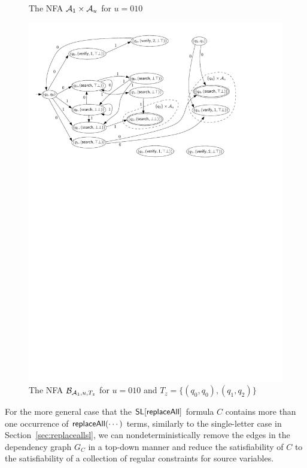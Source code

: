 \begin{example}
\begin{figure}[htbp]
\begin{center}
\end{center}
\caption{The NFA $\mathcal{A}_1 \times \mathcal{A}_u$ for $u = 010$}\label{fig-cs-exmp}
\end{figure}
%
\begin{figure}[htbp]
\begin{center}
\includegraphics[scale=0.65]{constant-string-example-2.pdf}
\end{center}
\caption{The NFA $\mathcal{B}_{\mathcal{A}_1, u, T_z}$ for $u = 010$ and $T_z= \{(q_0,q_0),(q_1,q_2)\}$}\label{fig-cs-exmp-2}
\end{figure}
\end{example}


For the more general case that the $\mathsf{SL}[\mathsf{replaceAll}]$ formula $C$ contains more than one occurrence of $\mathsf{replaceAll}(\cdots)$ terms, similarly to the single-letter case in Section~\ref{sec:replaceallsl}, we can nondeterministically remove the edges in the dependency graph $G_C$ in a top-down manner and reduce the satisfiability of $C$ to the satisfiability of a collection of regular constraints for source variables.

